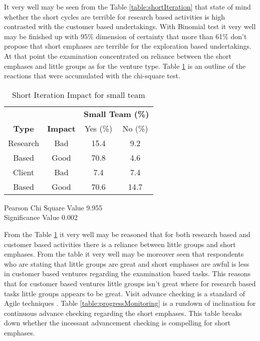 It very well may be seen from the Table \ref{table:shortIteration} that state of mind whether the short cycles are terrible for research based activities is high contrasted with the customer based undertakings. With Binomial test it very well may be finished up with 95\% dimension of certainty that more than 61\% don't propose that short emphases are terrible for the exploration based undertakings. At that point the examination concentrated on reliance between the short emphases and little groups as for the venture type. Table \ref{table:smallTeamIteration} is an outline of the reactions that were accumulated with the chi-square test. 

\begin{table}[htbp]
	\caption{Short Iteration Impact for small team}
	\begin{center}
		\renewcommand\arraystretch{2}
		\begin{tabular}{|c|c|c|c|}
			\hline
			\textbf{}& \textbf{} &\multicolumn{2}{c|}{\textbf{Small Team (\%)}}
			\\ \cline{3-4}
			\textbf{Type} & \textbf{Impact} & Yes (\%) & No (\%)
			\\ \hline
			Research & Bad & 15.4 & 9.2
			\\ \cline{2-4}
			Based & Good& 70.8 & 4.6
			\\ \hline
			Client & Bad & 7.4 & 7.4
			\\ \cline{2-4}
			Based & Good& 70.6 & 14.7
			\\ \hline
		\end{tabular}
	\end{center}
	Pearson Chi Square Value  9.955
	\\ Significance Value 0.002
\label{table:smallTeamIteration}
\end{table}


From the Table \ref{table:smallTeamIteration} it very well may be reasoned that for both research based and customer based activities there is a reliance between little groups and short emphases. From the table it very well may be moreover seen that respondents who are stating that little groups are great and short emphases are awful is less in customer based ventures regarding the examination based tasks. This reasons that for customer based ventures little groups isn't great where for research based tasks little groups appears to be great. Visit advance checking is a standard of Agile techniques \cite{agilemanifesto}. Table \ref{table:progressMonitoring} is a rundown of inclination for continuous advance checking regarding the short emphases. This table breaks down whether the incessant advancement checking is compelling for short emphases.

